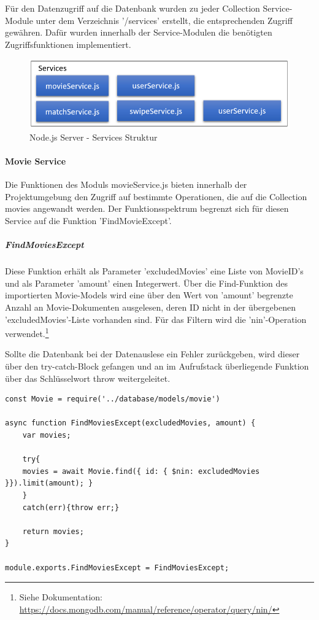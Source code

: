 Für den Datenzugriff auf die Datenbank wurden zu jeder Collection Service-Module unter dem Verzeichnis '/services' erstellt, die entsprechenden Zugriff gewähren. Dafür wurden innerhalb der Service-Modulen  die benötigten Zugriffsfunktionen implementiert.

\begin{figure}[h]
\centering
\includegraphics[width=12cm]{images/serviceStruktur.PNG}
\caption{Node.js Server - Services Struktur}
\end{figure}


%
%

\paragraph{Movie Service}
Die Funktionen des Moduls movieService.js bieten innerhalb der Projektumgebung den Zugriff auf bestimmte Operationen, die  auf die Collection movies angewandt werden. Der Funktionsspektrum begrenzt sich für diesen Service auf die Funktion 'FindMovieExcept'.

\noindent
\subparagraph{FindMoviesExcept}
Diese Funktion erhält als Parameter 'excludedMovies' eine Liste von MovieID's und als Parameter 'amount' einen Integerwert.
Über die Find-Funktion des importierten Movie-Models wird eine über den Wert von 'amount' begrenzte Anzahl an Movie-Dokumenten ausgelesen, deren ID nicht in der übergebenen 'excludedMovies'-Liste vorhanden sind. Für das Filtern wird die 'nin'-Operation verwendet.\footnote{Siehe Dokumentation: \url{https://docs.mongodb.com/manual/reference/operator/query/nin/}}

Sollte die Datenbank bei der Datenauslese ein Fehler zurückgeben, wird dieser über den try-catch-Block gefangen und an im Aufrufstack überliegende Funktion über das Schlüsselwort throw weitergeleitet.

\begin{lstlisting}[caption=movieService.js - FindMoviesExcept, label=lst:findmoviesexcept]
const Movie = require('../database/models/movie')

async function FindMoviesExcept(excludedMovies, amount) {
    var movies;

    try{ 
    movies = await Movie.find({ id: { $nin: excludedMovies }}).limit(amount); }
    }
    catch(err){throw err;}

    return movies;
}

module.exports.FindMoviesExcept = FindMoviesExcept;
\end{lstlisting}


